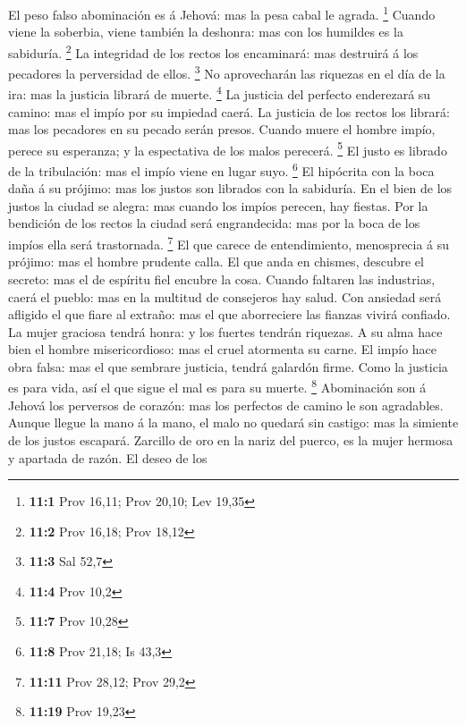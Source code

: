  El peso falso abominación es á Jehová: mas la pesa cabal
le agrada. \footnote{\textbf{11:1} Prov 16,11; Prov 20,10; Lev 19,35}
 Cuando viene la soberbia, viene también la deshonra: mas
con los humildes es la sabiduría. \footnote{\textbf{11:2} Prov 16,18;
  Prov 18,12}  La integridad de los rectos los encaminará:
mas destruirá á los pecadores la perversidad de ellos. \footnote{\textbf{11:3}
  Sal 52,7}  No aprovecharán las riquezas en el día de la
ira: mas la justicia librará de muerte. \footnote{\textbf{11:4} Prov
  10,2}  La justicia del perfecto enderezará su camino:
mas el impío por su impiedad caerá.  La justicia de los
rectos los librará: mas los pecadores en su pecado serán presos.
 Cuando muere el hombre impío, perece su esperanza; y la
espectativa de los malos perecerá. \footnote{\textbf{11:7} Prov 10,28}
 El justo es librado de la tribulación: mas el impío viene
en lugar suyo. \footnote{\textbf{11:8} Prov 21,18; Is 43,3}
 El hipócrita con la boca daña á su prójimo: mas los
justos son librados con la sabiduría.  En el bien de los
justos la ciudad se alegra: mas cuando los impíos perecen, hay fiestas.
 Por la bendición de los rectos la ciudad será
engrandecida: mas por la boca de los impíos ella será trastornada.
\footnote{\textbf{11:11} Prov 28,12; Prov 29,2}  El que
carece de entendimiento, menosprecia á su prójimo: mas el hombre
prudente calla.  El que anda en chismes, descubre el
secreto: mas el de espíritu fiel encubre la cosa.  Cuando
faltaren las industrias, caerá el pueblo: mas en la multitud de
consejeros hay salud.  Con ansiedad será afligido el que
fiare al extraño: mas el que aborreciere las fianzas vivirá confiado.
 La mujer graciosa tendrá honra: y los fuertes tendrán
riquezas.  A su alma hace bien el hombre misericordioso:
mas el cruel atormenta su carne.  El impío hace obra
falsa: mas el que sembrare justicia, tendrá galardón firme.
 Como la justicia es para vida, así el que sigue el mal
es para su muerte. \footnote{\textbf{11:19} Prov 19,23} 
Abominación son á Jehová los perversos de corazón: mas los perfectos de
camino le son agradables.  Aunque llegue la mano á la
mano, el malo no quedará sin castigo: mas la simiente de los justos
escapará.  Zarcillo de oro en la nariz del puerco, es la
mujer hermosa y apartada de razón.  El deseo de los
